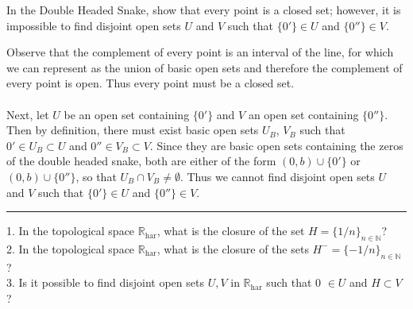 \documentclass[a4paper,12pt,twoside]{hmcpset}
\begin{document}
\begin{exercise}[Exercise 4.8] In the Double Headed Snake, show that every
point is a closed set; however, it is impossible to find disjoint open
sets $U$ and $V$ such that $\{0'\} \in U$ and $\{0''\} \in V$. 
\end{exercise}

\begin{solution}
Observe that the complement of every point is an interval of the line, for which we 
can represent as the union of basic open sets and therefore 
the complement of every point is open. Thus every point must be a
closed set. 
\\
\\
 Next, let $U$ be an open set
 containing $\{0'\}$ and $V$ an open set containing $\{0''\}$. Then by definition, 
 there must exist basic open sets $U_B$, $V_B$ such that $0' \in U_B \subset U$
 and $0'' \in V_B \subset V$. Since they are basic open sets containing the zeros 
 of the double headed snake, both are either of the form $(0, b) \cup \{0'\}$
 or $(0, b) \cup \{0''\}$, so that $U_B \cap V_B \ne \emptyset.$ Thus 
 we cannot find disjoint open sets $U$ and $V$ such that $\{0'\} \in U$ and $\{0''\} 
 \in V$.
\end{solution}

\noindent\rule{18cm}{1pt}
\begin{exercise}[Exercise 4.9]
1. In the topological space $\mathbb{R}_\text{har}$, what is the
closure of the set $H = \{1/n\}_{n \in \mathbb{N}}$?\\
2. In the topological space $\mathbb{R}_\text{har}$, what is the
closure of the sets $H^{-} = \{-1/n\}_{n \in \mathbb{N}}$?\\
3. Is it possible to find disjoint open sets $U, V$ in
$\mathbb{R}_\text{har}$ such that 0 $\in U$ and $H \subset V$?
\end{exercise}
\end{document}
